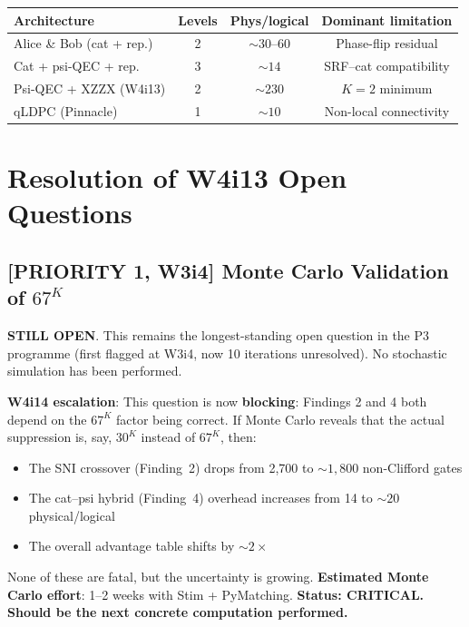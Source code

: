 \documentclass[11pt]{article}
\theoremstyle{definition}
\theoremstyle{remark}
\begin{document}
\begin{center}
\begin{tabular}{@{}lccc@{}}
\toprule
Architecture & Levels & Phys/logical & Dominant limitation \\
\midrule
Alice \& Bob (cat + rep.) & 2 & $\sim 30$--$60$ & Phase-flip residual \\
Cat + psi-QEC + rep. & 3 & $\sim 14$ & SRF--cat compatibility \\
Psi-QEC + XZZX (W4i13) & 2 & $\sim 230$ & $K=2$ minimum \\
qLDPC (Pinnacle) & 1 & $\sim 10$ & Non-local connectivity \\
\bottomrule
\end{tabular}
\end{center}

\section{Resolution of W4i13 Open Questions}
\label{sec:open-resolution}

\subsection{[PRIORITY 1, W3i4] Monte Carlo Validation of $67^K$}

\textbf{STILL OPEN}.  This remains the longest-standing open question
in the P3 programme (first flagged at W3i4, now 10 iterations unresolved).
No stochastic simulation has been performed.

\textbf{W4i14 escalation}: This question is now \textbf{blocking}:
Findings 2 and 4 both depend on the $67^K$ factor being correct.
If Monte Carlo reveals that the actual suppression is, say, $30^K$
instead of $67^K$, then:
\begin{itemize}[nosep]
  \item The SNI crossover (Finding~2) drops from 2,700 to $\sim 1,800$
    non-Clifford gates
  \item The cat--psi hybrid (Finding~4) overhead increases from 14 to
    $\sim 20$ physical/logical
  \item The overall advantage table shifts by $\sim 2\times$
\end{itemize}
None of these are fatal, but the uncertainty is growing.
\textbf{Estimated Monte Carlo effort}: 1--2 weeks with Stim + PyMatching.
\textbf{Status: CRITICAL.  Should be the next concrete computation
performed.}
\end{document}
